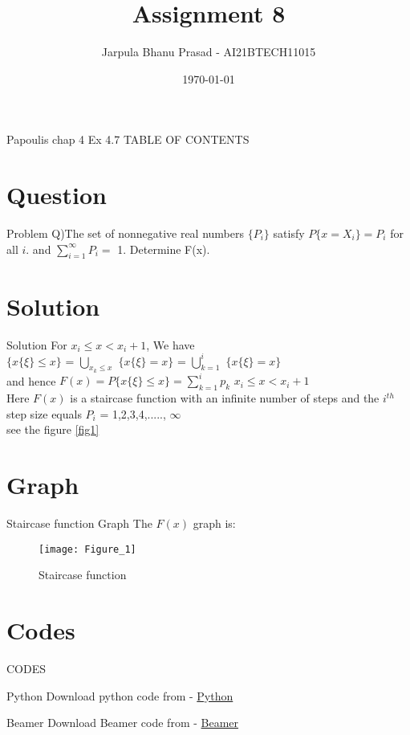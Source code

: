 \documentclass{beamer}
\title{Assignment 8}
\author{Jarpula Bhanu Prasad - AI21BTECH11015}
\date{\today}
\begin{document}
\begin{frame}
    \titlepage 
\end{frame}

\logo{}


\begin{frame}{Papoulis chap 4 Ex 4.7}
TABLE OF CONTENTS
    \tableofcontents
\end{frame}


\section{Question}
\begin{frame}{Problem}
Q)The set of nonnegative real numbers $\{P_i\}$ satisfy $P\{x = X_i\} = P_i$ for all $i$. and
$\sum_{i=1}^\infty P_i =$ 1. Determine F(x). 
\end{frame}

\section{Solution}
\begin{frame}{Solution}
    For $x_i \le x < x_i+1$,  We have \\ $\{x\{\xi\} \le x\}$ = $\bigcup_{x_k \le x}$ $\{x\{\xi\} = x\}$ = $\bigcup_{k=1}^i$ $\{x\{\xi\} = x\}$ \\
    and hence $F(x) = P\{x\{\xi\} \le x\} = \sum_{k=1}^i p_k$ \hspace{5mm} $x_i \le x < x_i+1$ \\
    Here $F(x)$ is a staircase function with an infinite number of steps and the $i^{th}$ step size equals $P_i$ = 1,2,3,4,....., $\infty$ \\
    see the figure \eqref{fig1}
\end{frame}

\section{Graph}
\begin{frame}{Staircase function Graph}
The $F(x)$ graph is:
    \begin{figure}[!ht]
		\centering
		\texttt{[image: Figure\_1]}
		\caption{Staircase function}
		\label{fig1}
	\end{figure}
\end{frame}

\section{Codes}
\begin{frame}{CODES}
    \begin{block}{Python}
         Download python code from - \href{https://github.com/jarpula-Bhanu/Assignment-8/blob/main/codes/Graph.py}{Python}
    \end{block}

 \begin{block}{Beamer}
         Download Beamer code from - \href{https://github.com/jarpula-Bhanu/Assignment-8/blob/main/Assignment_8.tex}{Beamer}
    \end{block}
\end{frame} 
\end{document}
